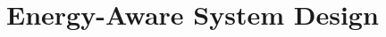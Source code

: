 \documentclass[conference]{IEEEtran}
\begin{document}


\section{Energy-Aware System Design} 
\label{sec:approach}

\end{document}
